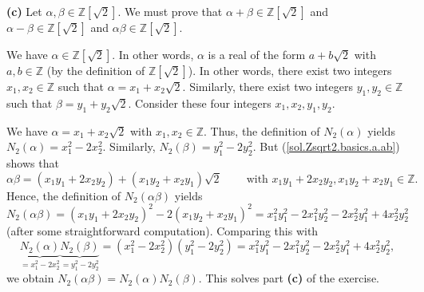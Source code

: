 \documentclass[paper=a4, fontsize=12pt]{scrartcl}%
\theoremstyle{plainsl}
\theoremstyle{definition}
\theoremstyle{remark}
\begin{document}
\textbf{(c)} Let $\alpha,\beta\in\mathbb{Z}\left[  \sqrt{2}\right]  $. We must
prove that $\alpha+\beta\in\mathbb{Z}\left[  \sqrt{2}\right]  $ and
$\alpha-\beta\in\mathbb{Z}\left[  \sqrt{2}\right]  $ and $\alpha\beta
\in\mathbb{Z}\left[  \sqrt{2}\right]  $.

We have $\alpha\in\mathbb{Z}\left[  \sqrt{2}\right]  $. In other words,
$\alpha$ is a real of the form $a+b\sqrt{2}$ with $a,b\in\mathbb{Z}$ (by the
definition of $\mathbb{Z}\left[  \sqrt{2}\right]  $). In other words, there
exist two integers $x_{1},x_{2}\in\mathbb{Z}$ such that $\alpha=x_{1}%
+x_{2}\sqrt{2}$. Similarly, there exist two integers $y_{1},y_{2}\in
\mathbb{Z}$ such that $\beta=y_{1}+y_{2}\sqrt{2}$. Consider these four
integers $x_{1},x_{2},y_{1},y_{2}$.

We have $\alpha=x_{1}+x_{2}\sqrt{2}$ with $x_{1},x_{2}\in\mathbb{Z}$. Thus,
the definition of $N_{2}\left(  \alpha\right)  $ yields $N_{2}\left(
\alpha\right)  =x_{1}^{2}-2x_{2}^{2}$. Similarly, $N_{2}\left(  \beta\right)
=y_{1}^{2}-2y_{2}^{2}$. But (\ref{sol.Zsqrt2.basics.a.ab}) shows that%
\[
\alpha\beta=\left(  x_{1}y_{1}+2x_{2}y_{2}\right)  +\left(  x_{1}y_{2}%
+x_{2}y_{1}\right)  \sqrt{2}\ \ \ \ \ \ \ \ \ \ \text{with }x_{1}y_{1}%
+2x_{2}y_{2},x_{1}y_{2}+x_{2}y_{1}\in\mathbb{Z}.
\]
Hence, the definition of $N_{2}\left(  \alpha\beta\right)  $ yields%
\[
N_{2}\left(  \alpha\beta\right)  =\left(  x_{1}y_{1}+2x_{2}y_{2}\right)
^{2}-2\left(  x_{1}y_{2}+x_{2}y_{1}\right)  ^{2}=x_{1}^{2}y_{1}^{2}-2x_{1}%
^{2}y_{2}^{2}-2x_{2}^{2}y_{1}^{2}+4x_{2}^{2}y_{2}^{2}%
\]
(after some straightforward computation). Comparing this with%
\[
\underbrace{N_{2}\left(  \alpha\right)  }_{=x_{1}^{2}-2x_{2}^{2}%
}\underbrace{N_{2}\left(  \beta\right)  }_{=y_{1}^{2}-2y_{2}^{2}}=\left(
x_{1}^{2}-2x_{2}^{2}\right)  \left(  y_{1}^{2}-2y_{2}^{2}\right)  =x_{1}%
^{2}y_{1}^{2}-2x_{1}^{2}y_{2}^{2}-2x_{2}^{2}y_{1}^{2}+4x_{2}^{2}y_{2}^{2},
\]
we obtain $N_{2}\left(  \alpha\beta\right)  =N_{2}\left(  \alpha\right)
N_{2}\left(  \beta\right)  $. This solves part \textbf{(c)} of the exercise.
\end{document}
